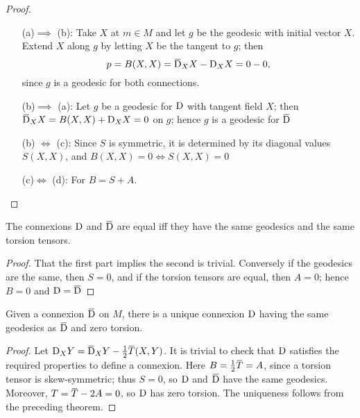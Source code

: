 \documentclass[../main]{subfiles}
\begin{document}
\begin{proof} 
\hfill

\begin{enumerate}
    \item[(a)$\implies$ (b):] Take $X$ at $m\in M$ and let $g$ be the geodesic with initial vector $X$. Extend $X$ along $g$ by letting $X$ be the tangent to $g$; then \[p=B(X,X)= \covariant_XX-\connection_XX=0-0,\] since $g$ is a geodesic for both connections.
    \item[(b)$\implies$ (a):] Let $g$ be a geodesic for $\mathrm{D}$ with tangent field $X$; then \newline $\covariant_XX = B(X,X)+\connection_XX=0$ on $g$; hence $g$ is a geodesic for $\covariant$
    \item[(b) $\iff$ (c):] Since $S$ is symmetric, it is determined by its diagonal values $S(X,X)$, and $B(X,X)=0\iff S(X,X)=0$
    \item[(c)$\iff$ (d):] For $B=S+A$. \qedhere
\end{enumerate}
\end{proof}



\begin{theorem}\label{thm:ch5.4.2}
The connexions $\mathrm{D}$ and $\covariant$ are equal iff they have the same geodesics and the same torsion tensors.
\end{theorem} 

\begin{proof}

 That the first part implies the second is trivial. Conversely if the geodesics are the same, then $S=0$, and if the torsion tensors are equal, then $A=0$; hence $B=0$ and $\connection=\covariant $
\end{proof}



\begin{theorem}\label{thm:ch5.4.3}
Given a connexion $\covariant$ on $M$, there is a unique connexion $\mathrm{D}$ having the same geodesics as $\covariant$ and zero torsion.
\end{theorem} 

\begin{proof}
 Let $\connection_{X}Y=\covariant_{X} {Y}-\frac{1}{2} \xoverline{T}(X, Y)$. It is trivial to check that $\mathrm{D}$ satisfies the required properties to define a connexion. Here $B=\frac{1}{2} \xoverline{T}=A$, since a torsion tensor is skew-symmetric; thus $S=0$, so $\mathrm{D}$ and $\covariant$ have the same geodesics. Moreover, $T=\xoverline{T}-2 A=0$, so $\mathrm{D}$ has zero torsion. The uniqueness follows from the preceding theorem.
\end{proof}
\end{document}
